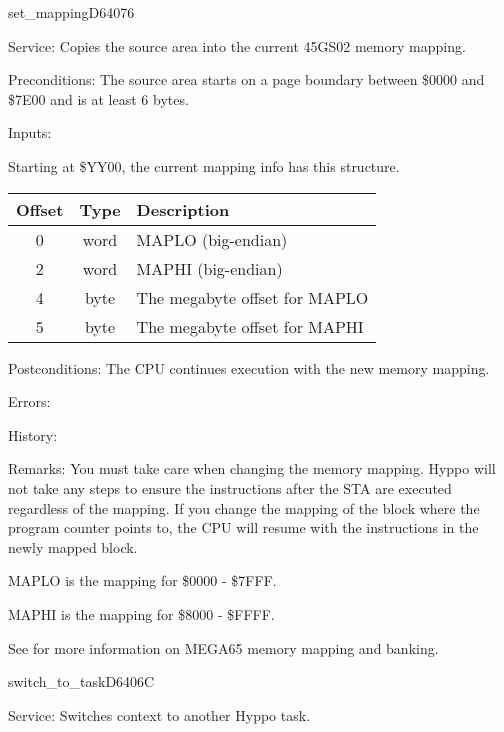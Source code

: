 \newpage
\begin{hyppotrap}{set\_mapping}{D640}{76}
\item [Service:]
  Copies the source area into the current 45GS02 memory mapping.
\item [Preconditions:]
  The source area starts on a page boundary between \$0000 and \$7E00 and
  is at least 6 bytes.
\item [Inputs:]

  Starting at \$YY00, the current mapping info has this structure.
  {\setlength{\tabcolsep}{2mm}
  \begin{tabular}{|c|c|p{6.9cm}|}
  \hline
  \textbf{Offset} & \textbf{Type} & \textbf{Description} \\
  \hline
  0 & word & MAPLO (big-endian) \\
  2 & word & MAPHI (big-endian) \\
  4 & byte & The megabyte offset for MAPLO \\
  5 & byte & The megabyte offset for MAPHI \\
  \hline
  \end{tabular}
  }
\item [Postconditions:]
  The CPU continues execution with the new memory mapping.
\item [Errors:]
\item [History:]
\item [Remarks:]
  You must take care when changing the memory mapping. Hyppo will not take any
  steps to ensure the instructions after the STA are executed regardless of the
  mapping. If you change the mapping of the block where the program counter
  points to, the CPU will resume with the instructions in the newly mapped
  block.

  MAPLO is the mapping for \$0000 - \$7FFF.

  MAPHI is the mapping for \$8000 - \$FFFF.

  See  for more information on MEGA65 memory mapping and
  banking.
\end{hyppotrap}


\newpage
\begin{hyppotrap}{switch\_to\_task}{D640}{6C}
\item [Service:]
  Switches context to another Hyppo task.
\notimplemented
\end{hyppotrap}


